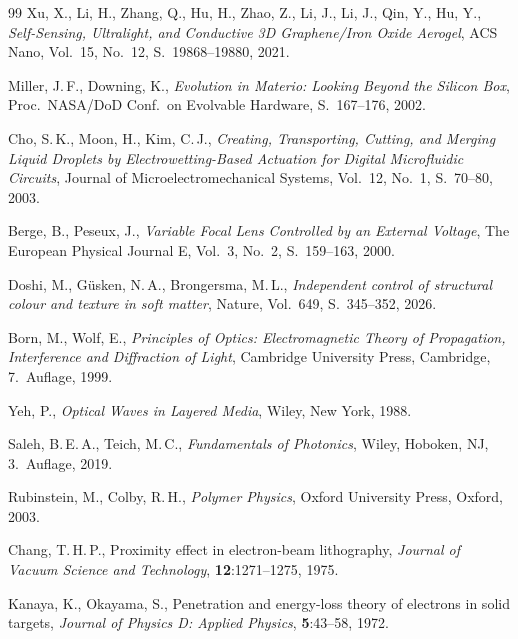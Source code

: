 ﻿\documentclass[a4paper,12pt]{scrreprt}
\theoremstyle{definition}
\begin{document}
\begin{thebibliography}{99}
  Xu, X., Li, H., Zhang, Q., Hu, H., Zhao, Z., Li, J., Li, J., Qin, Y., Hu, Y.,
  \textit{Self-Sensing, Ultralight, and Conductive 3D Graphene/Iron Oxide Aerogel},
  ACS Nano, Vol.~15, No.~12, S.~19868--19880, 2021.

  Miller, J.\,F., Downing, K.,
  \textit{Evolution in Materio: Looking Beyond the Silicon Box},
  Proc.\ NASA/DoD Conf.\ on Evolvable Hardware, S.~167--176, 2002.

  Cho, S.\,K., Moon, H., Kim, C.\,J.,
  \textit{Creating, Transporting, Cutting, and Merging Liquid Droplets by
  Electrowetting-Based Actuation for Digital Microfluidic Circuits},
  Journal of Microelectromechanical Systems, Vol.~12, No.~1, S.~70--80, 2003.

  Berge, B., Peseux, J.,
  \textit{Variable Focal Lens Controlled by an External Voltage},
  The European Physical Journal E, Vol.~3, No.~2, S.~159--163, 2000.

  Doshi, M., Güsken, N.\,A., Brongersma, M.\,L.,
  \textit{Independent control of structural colour and texture in soft matter},
  Nature, Vol.~649, S.~345--352, 2026.

  Born, M., Wolf, E.,
  \textit{Principles of Optics: Electromagnetic Theory of Propagation,
  Interference and Diffraction of Light},
  Cambridge University Press, Cambridge, 7.~Auflage, 1999.

  Yeh, P.,
  \textit{Optical Waves in Layered Media},
  Wiley, New York, 1988.

  Saleh, B.\,E.\,A., Teich, M.\,C.,
  \textit{Fundamentals of Photonics},
  Wiley, Hoboken, NJ, 3.~Auflage, 2019.

  Rubinstein, M., Colby, R.\,H.,
  \textit{Polymer Physics},
  Oxford University Press, Oxford, 2003.

  Chang, T.\,H.\,P.,
  Proximity effect in electron-beam lithography,
  \textit{Journal of Vacuum Science and Technology},
  \textbf{12}:1271--1275, 1975.

  Kanaya, K., Okayama, S.,
  Penetration and energy-loss theory of electrons in solid targets,
  \textit{Journal of Physics D: Applied Physics}, \textbf{5}:43--58, 1972.


\end{thebibliography}
\end{document}
